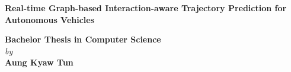 \begin{titlepage}
\enlargethispage{3cm}

\begin{center}

\vspace*{-1cm}

\textbf{\Large Real-time Graph-based Interaction-aware Trajectory Prediction for Autonomous Vehicles }\\[10pt]

\vspace*{0.5cm}


\vspace{5mm}
{\large \bf Bachelor Thesis in Computer Science } \\



                      \vspace{5mm}
                   {\em  by} \\ \vspace{3mm}
             {\large \bf Aung Kyaw Tun} \\



\end{center}
\end{titlepage}
